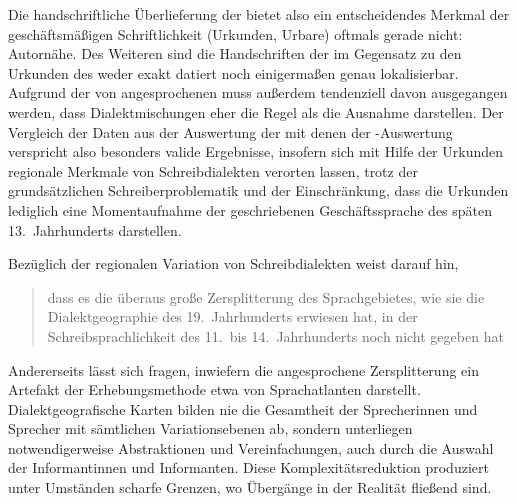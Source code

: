 Die handschriftliche Überlieferung der \citet{kc} bietet also ein
entscheidendes Merkmal der geschäftsmäßigen Schriftlichkeit (Urkunden, Urbare)
oftmals gerade nicht: Autornähe. Des Weiteren sind die Handschriften der
\citet{kc} im Gegensatz zu den Urkunden des \CAO{} weder exakt datiert
noch einigermaßen genau lokalisierbar. Aufgrund der von
\citet[1310]{wegera2000} angesprochenen  muss außerdem
tendenziell davon ausgegangen werden, dass Dialekt\-mischungen eher die Regel
als die Ausnahme darstellen. Der Vergleich der Daten aus der Auswertung der
\citet{kc} mit denen der \CAO{}-Auswertung verspricht also besonders
valide Ergebnisse, insofern sich mit Hilfe der Urkunden regionale Merkmale von
Schreibdialekten verorten lassen, trotz der grundsätzlichen
Schreiberproblematik und der Einschränkung, dass die Urkunden lediglich eine
Momentaufnahme der geschriebenen Geschäftssprache des späten 13.~Jahrhunderts
darstellen.

Bezüglich der regionalen Variation von Schreibdialekten weist \citet{solms2014}
darauf hin, \blockcquote[132]{solms2014}{dass es die überaus große
Zersplitterung des Sprachgebietes, wie sie die Dialektgeographie des
19.~Jahrhunderts erwiesen hat, in der Schreibsprachlichkeit des 11.\ bis
14.~Jahrhunderts noch nicht gegeben hat}. Andererseits lässt sich fragen,
inwiefern die angesprochene Zersplitterung ein Artefakt der Erhebungsmethode
etwa von Sprachatlanten darstellt. Dialektgeografische Karten bilden nie die
Gesamtheit der Sprecherinnen und Sprecher mit sämtlichen Variations\-ebenen ab,
sondern unterliegen notwendigerweise Abstraktionen und Vereinfachungen, auch
durch die Auswahl der Informantinnen und Informanten. Diese
Komplexitätsreduktion produziert unter Umständen scharfe Grenzen, wo Übergänge
in der Realität fließend sind.
